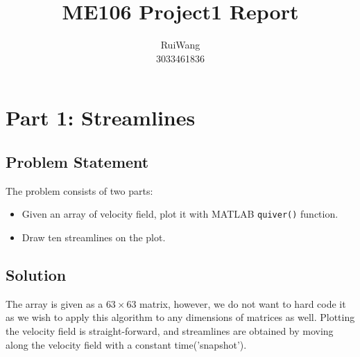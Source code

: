 \documentclass{article}
\title{ME106 Project1 Report}
\author{\large Rui\hspace{0.5cm}Wang \\ 3033461836}
\date{}
\begin{document}
\maketitle
\vspace{4cm}
\tableofcontents
\clearpage
\section{Part 1: Streamlines}

  \subsection{Problem Statement}
  The problem consists of two parts:
  \begin{itemize}
    \item Given an array of velocity field, plot it with MATLAB \texttt{quiver()} function.
    \item Draw ten streamlines on the plot.
  \end{itemize}

  \subsection{Solution}
  The array is given as a $63 \times 63$ matrix, however, we do not want to hard code it as we wish to apply this algorithm to any dimensions of matrices as well. Plotting the velocity field is straight-forward, and streamlines are obtained by moving along the velocity field with a constant time('snapshot').
  
\end{document}
